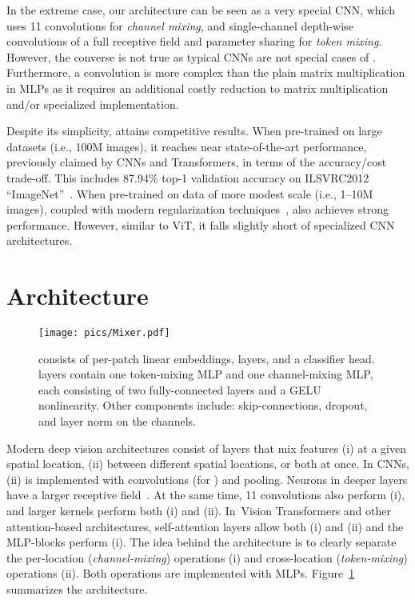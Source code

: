 In the extreme case, our architecture can be seen as a very special CNN, which uses 11 convolutions for \emph{channel mixing}, and single-channel depth-wise convolutions of a full receptive field and parameter sharing for \emph{token mixing}.
However, the converse is not true as typical CNNs are not special cases of \name{}. Furthermore, a convolution is more complex than the plain matrix multiplication in MLPs as it requires an additional costly reduction to matrix multiplication and/or specialized implementation. 

Despite its simplicity, \name{} attains competitive results.
When pre-trained on large datasets (i.e.,  100M images), it reaches near state-of-the-art performance, previously claimed by CNNs and Transformers, in terms of the accuracy/cost trade-off.
This includes 87.94\% top-1 validation accuracy on ILSVRC2012 ``ImageNet''~\citep{deng2009-imagenet}.
When pre-trained on data of more modest scale (i.e., 1--10M images), coupled with modern regularization techniques~\cite{deit,rw2019timm}, \name{} also achieves strong performance.
However, similar to ViT, it falls slightly short of specialized CNN architectures.

\section{\name{} Architecture}
\label{sec:architecture}
\begin{figure}[tb]
    \centering
    \texttt{[image: pics/Mixer.pdf]}
    \caption{
     \fullname{} consists of per-patch linear embeddings, \name{} layers, and a classifier head.
     \name{} layers contain one token-mixing MLP and one channel-mixing MLP, each consisting of two fully-connected layers and a GELU nonlinearity.
     Other components include: skip-connections, dropout, and layer norm on the channels.
    }
    \vspace{-.2cm}
  \label{fig:architecture}
\end{figure}


Modern deep vision architectures consist of layers that mix features (i) at a given spatial location, (ii) between different spatial locations, or both at once.
In CNNs, (ii) is implemented with  convolutions (for ) and pooling.
Neurons in deeper layers have a larger receptive field~\citep{araujo2019computing,luo2017understanding}.
At the same time, 11 convolutions also perform (i), and larger kernels perform both (i) and (ii).
In~Vision Transformers and other attention-based architectures, self-attention layers allow both (i) and (ii) and the MLP-blocks perform (i).
The idea behind the \name{} architecture is to clearly separate the per-location (\emph{channel-mixing}) operations (i) and cross-location (\emph{token-mixing}) operations (ii).
Both operations are implemented with MLPs.
Figure~\ref{fig:architecture} summarizes the architecture. 

